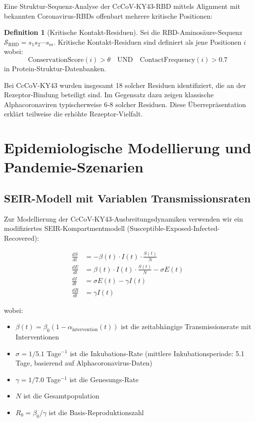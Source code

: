 \documentclass[11pt,a4paper]{article}
\theoremstyle{definition}
\newtheorem{definition}[theorem]{Definition}
\begin{document}
Eine Struktur-Sequenz-Analyse der CcCoV-KY43-RBD mittels Alignment mit bekannten Coronavi\-rus-RBDs offenbart mehrere kritische Positionen:

\begin{definition}[Kritische Kontakt-Residuen]
Sei die RBD-Aminosäure-Sequenz $\mathcal{S}_{\text{RBD}} = s_1 s_2 \cdots s_m$. Kritische Kontakt-Residuen sind definiert als jene Positionen $i$ wobei:
\[
\text{ConservationScore}(i) > \theta \quad \text{UND} \quad \text{ContactFrequency}(i) > 0.7
\]
in Protein-Struktur-Datenbanken.
\end{definition}

Bei CcCoV-KY43 wurden insgesamt 18 solcher Residuen identifiziert, die an der Rezeptor-Bindung beteiligt sind. Im Gegensatz dazu zeigen klassische Alphacoronaviren typischerweise 6-8 solcher Residuen. Diese Überrepräsentation erklärt teilweise die erhöhte Rezeptor-Vielfalt.

\section{Epidemiologische Modellierung und Pandemie-Szenarien}

\subsection{SEIR-Modell mit Variablen Transmissionsraten}

Zur Modellierung der CcCoV-KY43-Ausbreitungsdynamiken verwenden wir ein modifiziertes SEIR-Kompartmentmodell (Susceptible-Exposed-Infected-Recovered):

\begin{align}
    \frac{dS}{dt} &= -\beta(t) \cdot I(t) \cdot \frac{S(t)}{N} \\
    \frac{dE}{dt} &= \beta(t) \cdot I(t) \cdot \frac{S(t)}{N} - \sigma E(t) \\
    \frac{dI}{dt} &= \sigma E(t) - \gamma I(t) \\
    \frac{dR}{dt} &= \gamma I(t)
\end{align}

wobei:
\begin{itemize}
\item $\beta(t) = \beta_0 (1 - \alpha_{\text{intervention}}(t))$ ist die zeitabhängige Transmissionsrate mit Interventionen
\item $\sigma = 1/5.1$ Tage$^{-1}$ ist die Inkubations-Rate (mittlere Inkubationsperiode: 5.1 Tage, basierend auf Alphacoronavirus-Daten)
\item $\gamma = 1/7.0$ Tage$^{-1}$ ist die Genesungs-Rate
\item $N$ ist die Gesamtpopulation
\item $R_0 = \beta_0 / \gamma$ ist die Basis-Reproduktionszahl
\end{itemize}
\end{document}
